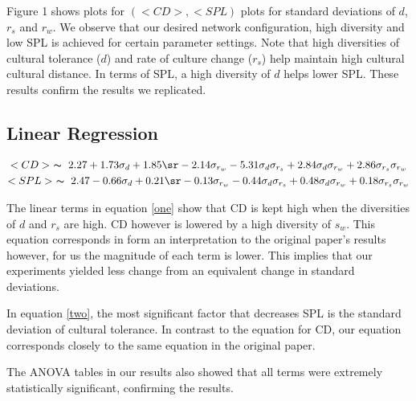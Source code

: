 Figure 1 shows plots for $(<CD>, <SPL)$ plots for standard deviations of
$d$, $r_s$ and $r_w$.
We observe that our desired network configuration, high diversity and
low SPL is achieved for certain parameter settings.
Note that high diversities of cultural tolerance ($d$) and rate of
culture change ($r_s$) help maintain high cultural cultural distance.
In terms of SPL, a high diversity of $d$ helps lower SPL.
These results confirm the results we replicated.



\subsection{Linear Regression}
\begin{gather}\label{eq:base}
    <CD> ~ \thicksim ~ 2.27 + 1.73\sd + 1.85\sr - 2.14\sw -
                5.31\ds + 2.84\dw + 2.86\ssw \label{one}\\
    <SPL> ~ \thicksim ~ 2.47 - 0.66\sd + 0.21\sr - 0.13 \sw -
                0.44\ds + 0.48\dw + 0.18\ssw \label{two}
\end{gather}

The linear terms in equation \eqref{one} show that CD is kept high
when the diversities of $d$ and $r_s$ are high.
CD however is lowered
by a high diversity of $s_w$.
This equation corresponds in form an interpretation to the original paper's
results however, for us the magnitude of each term is lower.
This implies that our experiments yielded less change from an equivalent change
in standard deviations.

In equation \eqref{two}, the most significant factor that decreases SPL is
the standard deviation of cultural tolerance.
In contrast to the equation for CD, our equation corresponds closely to the
same equation in the original paper.

The ANOVA tables in our results also showed that all terms were
extremely statistically significant, confirming the results.